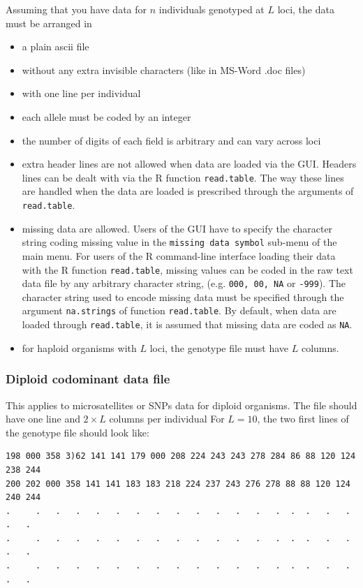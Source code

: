 \documentclass{article}
\begin{document}
Assuming that you have data for $n$  individuals  genotyped at $L$ loci, 
the data must be arranged in 
\begin{itemize}
\item a plain ascii file 
\item without any extra invisible characters (like in MS-Word .doc files)
\item with one line per individual
\item each allele must be coded by an integer
\item the number of digits of each field is arbitrary and can vary across loci
\item extra header lines are not allowed when data are loaded via the GUI. 
Headers lines can be dealt with via the R function \texttt{read.table}. 
 The way these lines are handled when the data are loaded is prescribed 
through the arguments of \texttt{read.table}.
\item missing data  are allowed. 
Users of the GUI have to specify the character string coding missing value in the \texttt{missing data symbol} sub-menu 
of the main menu. 
For users of the R command-line interface loading their data with the R function \texttt{read.table}, 
missing values can be coded in the raw text data file by any arbitrary character string, 
(e.g. {\tt000, 00, NA} or {\tt -999}). 
The character string used to encode missing data must be specified through the argument \texttt{na.strings} 
of function \texttt{read.table}. By default, when data are loaded through \texttt{read.table}, 
it is assumed that missing data 
are coded as {\tt NA}.
\item for haploid organisms with $L$ loci, the genotype file must have $L$ columns.
\end{itemize}

\subsubsection{Diploid codominant data file}

This applies to microsatellites or SNPs data for diploid organisms.
The file should have one line and $2\times L$ columns per individual
For $L=10$, the two first lines of the genotype file should look like:\\

\medskip
\begin{verbatim}
198 000 358 3)62 141 141 179 000 208 224 243 243 278 284 86 88 120 124 238 244
200 202 000 358 141 141 183 183 218 224 237 243 276 278 88 88 120 124 240 244
.     .   .   .   .   .   .   .   .   .   .   .   .   .  .  .   .   .   .   .
.     .   .   .   .   .   .   .   .   .   .   .   .   .  .  .   .   .   .   .
.     .   .   .   .   .   .   .   .   .   .   .   .   .  .  .   .   .   .   .
\end{verbatim}
\end{document}
